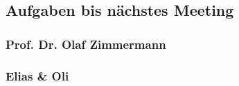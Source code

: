\hypertarget{aufgaben-bis-nachstes-meeting}{%
\subsection*{Aufgaben bis nächstes
Meeting}\label{aufgaben-bis-nachstes-meeting}}

\hypertarget{prof.-dr.-olaf-zimmermann}{%
\subsubsection*{Prof. Dr. Olaf
Zimmermann}\label{prof.-dr.-olaf-zimmermann}}

\hypertarget{elias-ux5cux26-oli}{%
\subsubsection*{Elias \& Oli}\label{elias-ux5cux26-oli}}
